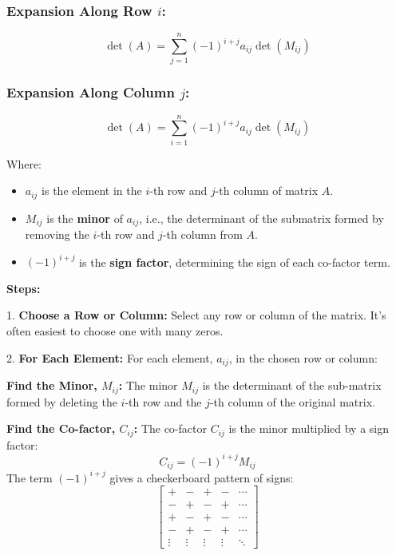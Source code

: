 \subsubsection*{Expansion Along Row \(i\):}

\[
\det(A) = \sum_{j=1}^{n} {(-1)}^{i+j} a_{ij} \det(M_{ij})
\]

\subsubsection*{Expansion Along Column \(j\):}

\[
\det(A) = \sum_{i=1}^{n} {(-1)}^{i+j} a_{ij} \det(M_{ij})
\]

Where:

\begin{itemize}
    \item \( a_{ij} \) is the element in the \(i\)-th row and \(j\)-th column of matrix \(A\).
    \item \( M_{ij} \) is the \textbf{minor} of \( a_{ij} \), i.e., the determinant of the submatrix formed by removing the \(i\)-th row and \(j\)-th column from \(A\).
    \item \( {(-1)}^{i+j} \) is the \textbf{sign factor}, determining the sign of each co-factor term.
\end{itemize}

\textbf{Steps:}

1.\textbf{ Choose a Row or Column:} Select any row or column of the matrix.  It's often easiest to choose one with many zeros.

 2.\textbf{ For Each Element:} For each element, \(a_{ij}\), in the chosen row or column:

    \textbf{Find the Minor, \(M_{ij}\):} The minor \(M_{ij}\) is the determinant of the sub-matrix formed by deleting the 
    \indent \(i\)-th row and the \(j\)-th column of the original matrix.

    \textbf{Find the Co-factor, \(C_{ij}\):} The co-factor \(C_{ij}\) is the minor multiplied by a sign factor:
        \[
        C_{ij} = {(-1)}^{i+j} M_{ij}
        \]
        The term  \({(-1)}^{i+j}\)  gives a checkerboard pattern of signs:
        \[
        \begin{bmatrix}
        + & - & + & - & \cdots \\
        - & + & - & + & \cdots \\
        + & - & + & - & \cdots \\
        - & + & - & + & \cdots \\
        \vdots & \vdots & \vdots & \vdots & \ddots
        \end{bmatrix}
        \]

